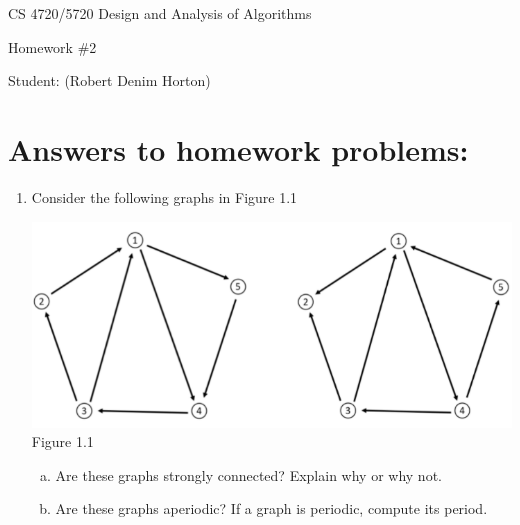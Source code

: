 \documentclass[11pt]{article}
\begin{document}
 

\rhead{\today}

\begin{center}\begin{Large}
CS 4720/5720 Design and Analysis of Algorithms

Homework \#2

Student: (Robert Denim Horton)
\end{Large}
\end{center}


\section*{Answers to homework problems:}

\begin{enumerate}
	\item Consider the following graphs in Figure 1.1
	\begin{center}
		\includegraphics[scale=0.6]{Question1_Figure1.1}\\
		Figure 1.1
	\end{center}
		\begin{enumerate}[(a)]
			\item Are these graphs strongly connected? Explain why or why not.
			\item Are these graphs aperiodic? If a graph is periodic, compute its period.
		\end{enumerate}
\end{enumerate}
\end{document}
